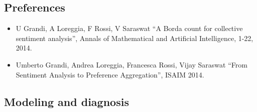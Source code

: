 \documentclass{article}
\begin{document}
\subsection*{Preferences}
\begin{itemize}
\item U Grandi, A Loreggia, F Rossi, V Saraswat ``A Borda count for
  collective sentiment analysis'', Annals of Mathematical and
  Artificial Intelligence, 1-22, 2014. 
\item Umberto Grandi, Andrea Loreggia, Francesca Rossi, Vijay Saraswat
  ``From Sentiment Analysis to Preference Aggregation'', ISAIM 2014.
\end{itemize}
\subsection*{Modeling and diagnosis}
\end{document}
